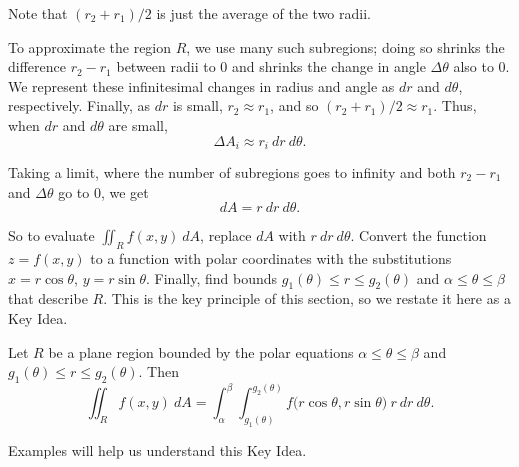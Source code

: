 Note that $(r_2+r_1)/2$ is just the average of the two radii. 

To approximate the region $R$, we use many such subregions; doing so shrinks the difference $r_2-r_1$ between radii to 0 and shrinks the change in angle $\Delta \theta$ also to 0. We represent these infinitesimal changes in radius and angle as $dr$ and $d\theta$, respectively. Finally, as $dr$ is small, $r_2\approx r_1$, and so $(r_2+r_1)/2\approx r_1$. Thus, when $dr$ and $d\theta$ are small, 
$$\Delta A_i \approx r_i\ dr\ d\theta.$$

Taking a limit, where the number of subregions goes to infinity and both $r_2-r_1$ and $\Delta\theta$ go to 0, we get $$dA = r\ dr\ d\theta.$$

So to evaluate $\iint_Rf(x,y)\ dA$, replace $dA$ with $r\ dr\ d\theta$. Convert the function $z=f(x,y)$ to a function with polar coordinates with the substitutions $x=r\cos\theta$, $y=r\sin\theta$. Finally, find bounds $g_1(\theta)\leq r\leq g_2(\theta)$ and $\alpha\leq\theta\leq\beta$ that describe $R$. This is the key principle of this section, so we restate it here as a Key Idea.

{Let $R$ be a plane region bounded by the polar equations $\alpha\leq\theta\leq\beta$ and  $g_1(\theta)\leq r\leq g_2(\theta)$. Then
$$\iint_Rf(x,y)\ dA = \int_\alpha^\beta\int_{g_1(\theta)}^{g_2(\theta)} f\big(r\cos\theta,r\sin\theta\big)\ r\ dr\ d\theta.$$
}

\enlargethispage{2\baselineskip}
Examples will help us understand this Key Idea.\\

